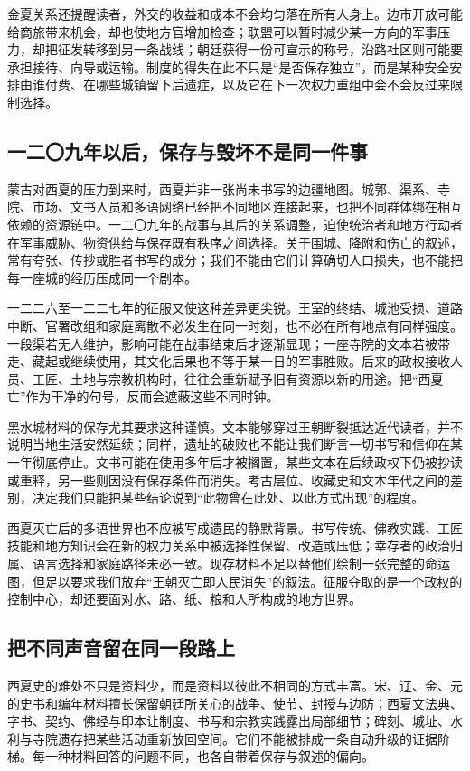 金夏关系还提醒读者，外交的收益和成本不会均匀落在所有人身上。边市开放可能给商旅带来机会，却也使地方官增加检查；联盟可以暂时减少某一方向的军事压力，却把征发转移到另一条战线；朝廷获得一份可宣示的称号，沿路社区则可能要承担接待、向导或运输。制度的得失在此不只是“是否保存独立”，而是某种安全安排由谁付费、在哪些城镇留下后遗症，以及它在下一次权力重组中会不会反过来限制选择。

\subsection{一二〇九年以后，保存与毁坏不是同一件事}

蒙古对西夏的压力到来时，西夏并非一张尚未书写的边疆地图。城郭、渠系、寺院、市场、文书人员和多语网络已经把不同地区连接起来，也把不同群体绑在相互依赖的资源链中。一二〇九年的战事与其后的关系调整，迫使统治者和地方行动者在军事威胁、物资供给与保存既有秩序之间选择。关于围城、降附和伤亡的叙述，常有夸张、传抄或胜者书写的成分；我们不能由它们计算确切人口损失，也不能把每一座城的经历压成同一个剧本。

一二二六至一二二七年的征服又使这种差异更尖锐。王室的终结、城池受损、道路中断、官署改组和家庭离散不必发生在同一时刻，也不必在所有地点有同样强度。一段渠若无人维护，影响可能在战事结束后才逐渐显现；一座寺院的文本若被带走、藏起或继续使用，其文化后果也不等于某一日的军事胜败。后来的政权接收人员、工匠、土地与宗教机构时，往往会重新赋予旧有资源以新的用途。把“西夏亡”作为干净的句号，反而会遮蔽这些不同时钟。

黑水城材料的保存尤其要求这种谨慎。文本能够穿过王朝断裂抵达近代读者，并不说明当地生活安然延续；同样，遗址的破败也不能让我们断言一切书写和信仰在某一年彻底停止。文书可能在使用多年后才被搁置，某些文本在后续政权下仍被抄读或重释，另一些则因没有保存条件而消失。考古层位、收藏史和文本年代之间的差别，决定我们只能把某些结论说到“此物曾在此处、以此方式出现”的程度。

西夏灭亡后的多语世界也不应被写成遗民的静默背景。书写传统、佛教实践、工匠技能和地方知识会在新的权力关系中被选择性保留、改造或压低；幸存者的政治归属、语言选择和家庭路径未必一致。现存材料不足以替他们绘制一张完整的命运图，但足以要求我们放弃“王朝灭亡即人民消失”的叙法。征服夺取的是一个政权的控制中心，却还要面对水、路、纸、粮和人所构成的地方世界。

\subsection{把不同声音留在同一段路上}

西夏史的难处不只是资料少，而是资料以彼此不相同的方式丰富。宋、辽、金、元的史书和编年材料擅长保留朝廷所关心的战争、使节、封授与边防；西夏文法典、字书、契约、佛经与印本让制度、书写和宗教实践露出局部细节；碑刻、城址、水利与寺院遗存把某些活动重新放回空间。它们不能被排成一条自动升级的证据阶梯。每一种材料回答的问题不同，也各自带着保存与叙述的偏向。

